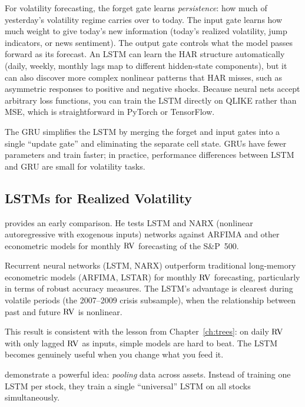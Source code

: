 \begin{projectconnection}
For volatility forecasting, the forget gate learns \emph{persistence}: how much of yesterday's volatility regime carries over to today.
The input gate learns how much weight to give today's new information (today's realized volatility, jump indicators, or news sentiment).
The output gate controls what the model passes forward as its forecast.
An LSTM can learn the HAR structure automatically (daily, weekly, monthly lags map to different hidden-state components), but it can also discover more complex nonlinear patterns that HAR misses, such as asymmetric responses to positive and negative shocks.
Because neural nets accept arbitrary loss functions, you can train the LSTM directly on QLIKE rather than MSE, which is straightforward in PyTorch or TensorFlow.
\end{projectconnection}

The GRU simplifies the LSTM by merging the forget and input gates into a single ``update gate'' and eliminating the separate cell state.
GRUs have fewer parameters and train faster; in practice, performance differences between LSTM and GRU are small for volatility tasks.

\subsection{LSTMs for Realized Volatility}

\citet{Bucci2020} provides an early comparison.
He tests LSTM and NARX (nonlinear autoregressive with exogenous inputs) networks against ARFIMA and other econometric models for monthly $\operatorname{RV}$ forecasting of the S\&P~500.

\begin{keyresult}
Recurrent neural networks (LSTM, NARX) outperform traditional long-memory econometric models (ARFIMA, LSTAR) for monthly $\operatorname{RV}$ forecasting, particularly in terms of robust accuracy measures.
The LSTM's advantage is clearest during volatile periods (the 2007--2009 crisis subsample), when the relationship between past and future $\operatorname{RV}$ is nonlinear.
\end{keyresult}

This result is consistent with the lesson from Chapter~\ref{ch:trees}: on daily $\operatorname{RV}$ with only lagged $\operatorname{RV}$ as inputs, simple models are hard to beat.
The LSTM becomes genuinely useful when you change what you feed it.

\citet{SirignanoCont2019} demonstrate a powerful idea: \emph{pooling} data across assets.
Instead of training one LSTM per stock, they train a single ``universal'' LSTM on all stocks simultaneously.

